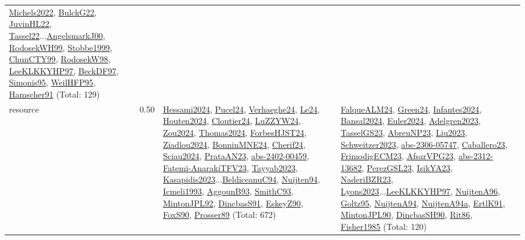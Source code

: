 {\begin{longtable}{p{3cm}r>{\raggedright\arraybackslash}p{6cm}>{\raggedright\arraybackslash}p{6cm}>{\raggedright\arraybackslash}p{8cm}}
\hyperref[detail:Michels2022]{Michels2022}, \hyperref[detail:BulckG22]{BulckG22}, \hyperref[detail:JuvinHL22]{JuvinHL22}, \hyperref[detail:Tassel22]{Tassel22}...\hyperref[detail:AngelsmarkJ00]{AngelsmarkJ00}, \hyperref[detail:RodosekWH99]{RodosekWH99}, \hyperref[detail:Stobbe1999]{Stobbe1999}, \hyperref[detail:ChunCTY99]{ChunCTY99}, \hyperref[detail:RodosekW98]{RodosekW98}, \hyperref[detail:LeeKLKKYHP97]{LeeKLKKYHP97}, \hyperref[detail:BeckDF97]{BeckDF97}, \hyperref[detail:Simonis95]{Simonis95}, \hyperref[detail:WeilHFP95]{WeilHFP95}, \hyperref[detail:Hamscher91]{Hamscher91} (Total: 129)\\
\index{resource}\index{Scheduling!resource}resource &  0.50 & \hyperref[detail:Hessami2024]{Hessami2024}, \hyperref[detail:Pucel24]{Pucel24}, \hyperref[detail:Verhaeghe24]{Verhaeghe24}, \hyperref[detail:Le24]{Le24}, \hyperref[detail:Houten2024]{Houten2024}, \hyperref[detail:Cloutier24]{Cloutier24}, \hyperref[detail:LuZZYW24]{LuZZYW24}, \hyperref[detail:Zou2024]{Zou2024}, \hyperref[detail:Thomas2024]{Thomas2024}, \hyperref[detail:ForbesHJST24]{ForbesHJST24}, \hyperref[detail:Ziadlou2024]{Ziadlou2024}, \hyperref[detail:BonninMNE24]{BonninMNE24}, \hyperref[detail:Cherif24]{Cherif24}, \hyperref[detail:Sciau2024]{Sciau2024}, \hyperref[detail:PrataAN23]{PrataAN23}, \hyperref[detail:abs-2402-00459]{abs-2402-00459}, \hyperref[detail:Fatemi-AnarakiTFV23]{Fatemi-AnarakiTFV23}, \hyperref[detail:Tayyab2023]{Tayyab2023}, \hyperref[detail:Kasapidis2023]{Kasapidis2023}...\hyperref[detail:BeldiceanuC94]{BeldiceanuC94}, \hyperref[detail:Nuijten94]{Nuijten94}, \hyperref[detail:Icmeli1993]{Icmeli1993}, \hyperref[detail:AggounB93]{AggounB93}, \hyperref[detail:SmithC93]{SmithC93}, \hyperref[detail:MintonJPL92]{MintonJPL92}, \hyperref[detail:DincbasS91]{DincbasS91}, \hyperref[detail:EskeyZ90]{EskeyZ90}, \hyperref[detail:FoxS90]{FoxS90}, \hyperref[detail:Prosser89]{Prosser89} (Total: 672) & \hyperref[detail:FalqueALM24]{FalqueALM24}, \hyperref[detail:Green24]{Green24}, \hyperref[detail:Infantes2024]{Infantes2024}, \hyperref[detail:Bansal2024]{Bansal2024}, \hyperref[detail:Euler2024]{Euler2024}, \hyperref[detail:Adelgren2023]{Adelgren2023}, \hyperref[detail:TasselGS23]{TasselGS23}, \hyperref[detail:AbreuNP23]{AbreuNP23}, \hyperref[detail:Liu2023]{Liu2023}, \hyperref[detail:Schweitzer2023]{Schweitzer2023}, \hyperref[detail:abs-2306-05747]{abs-2306-05747}, \hyperref[detail:Caballero23]{Caballero23}, \hyperref[detail:FrimodigECM23]{FrimodigECM23}, \hyperref[detail:AfsarVPG23]{AfsarVPG23}, \hyperref[detail:abs-2312-13682]{abs-2312-13682}, \hyperref[detail:PerezGSL23]{PerezGSL23}, \hyperref[detail:IsikYA23]{IsikYA23}, \hyperref[detail:NaderiBZR23]{NaderiBZR23}, \hyperref[detail:Lyons2023]{Lyons2023}...\hyperref[detail:LeeKLKKYHP97]{LeeKLKKYHP97}, \hyperref[detail:NuijtenA96]{NuijtenA96}, \hyperref[detail:Goltz95]{Goltz95}, \hyperref[detail:NuijtenA94]{NuijtenA94}, \hyperref[detail:NuijtenA94a]{NuijtenA94a}, \hyperref[detail:ErtlK91]{ErtlK91}, \hyperref[detail:MintonJPL90]{MintonJPL90}, \hyperref[detail:DincbasSH90]{DincbasSH90}, \hyperref[detail:Rit86]{Rit86}, \hyperref[detail:Fisher1985]{Fisher1985} (Total: 120) & 
\end{longtable}}

